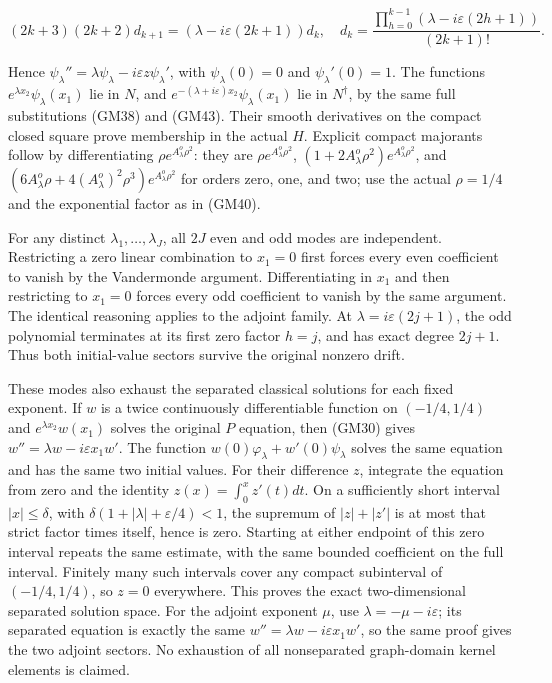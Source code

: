 \documentclass[
  11pt,
]{article}
\begin{document}
\[
 (2k+3)(2k+2)d_{k+1}
       =(\lambda-i\varepsilon(2k+1))d_k,
 \quad d_k=\frac{\prod_{h=0}^{k-1}(\lambda-i\varepsilon(2h+1))}{(2k+1)!}.
 \tag{GM48}
\]

Hence \(\psi_\lambda''=\lambda\psi_\lambda-i\varepsilon z\psi_\lambda'\), with \(\psi_\lambda(0)=0\) and
\(\psi_\lambda'(0)=1\). The functions \(e^{\lambda x_2}\psi_\lambda(x_1)\) lie
in \(N\), and \(e^{-(\lambda+i\varepsilon)x_2}\psi_\lambda(x_1)\) lie in
\(N^\dagger\), by the same full substitutions (GM38) and
(GM43). Their smooth derivatives on the compact closed square prove
membership in the actual \(H\). Explicit compact
majorants follow by differentiating \(\rho e^{A^o_\lambda\rho^2}\): they are
\(\rho e^{A^o_\lambda\rho^2}\), \((1+2A^o_\lambda\rho^2)e^{A^o_\lambda\rho^2}\), and
\((6A^o_\lambda\rho+4(A^o_\lambda)^2\rho^3)e^{A^o_\lambda\rho^2}\) for orders zero, one, and two; use the actual
\(\rho=1/4\) and the exponential factor as in (GM40).

For any distinct \(\lambda_1,\ldots,\lambda_J\), all
\(2J\) even and odd modes are independent.
Restricting a zero linear combination to \(x_1=0\)
first forces every even coefficient to vanish by the Vandermonde
argument. Differentiating in \(x_1\) and then
restricting to \(x_1=0\) forces every odd coefficient
to vanish by the same argument. The identical reasoning applies to the
adjoint family. At \(\lambda=i\varepsilon(2j+1)\), the odd polynomial
terminates at its first zero factor \(h=j\), and has
exact degree \(2j+1\). Thus both initial-value sectors
survive the original nonzero drift.

These modes also exhaust the separated classical solutions for each
fixed exponent. If \(w\) is a twice continuously
differentiable function on \((-1/4,1/4)\) and
\(e^{\lambda x_2}w(x_1)\) solves the original
\(P\) equation, then (GM30) gives
\(w''=\lambda w-i\varepsilon x_1w'\). The function \(w(0)\varphi_\lambda+w'(0)\psi_\lambda\)
solves the same equation and has the same two initial values. For their
difference \(z\), integrate the equation from zero
and the identity \(z(x)=\int_0^x z'(t)dt\). On a sufficiently short
interval \(|x|\leq\delta\), with \(\delta(1+|\lambda|+\varepsilon/4)<1\),
the supremum of \(|z|+|z'|\) is at most that strict factor
times itself, hence is zero. Starting at either endpoint of this zero
interval repeats the same estimate, with the same bounded coefficient on
the full interval. Finitely many such intervals cover any compact
subinterval of \((-1/4,1/4)\), so \(z=0\)
everywhere. This proves the exact two-dimensional separated solution
space. For the adjoint exponent \(\mu\), use
\(\lambda=-\mu-i\varepsilon\); its separated equation is exactly the same
\(w''=\lambda w-i\varepsilon x_1w'\), so the same proof gives the two adjoint
sectors. No exhaustion of all nonseparated graph-domain kernel elements
is claimed.
\end{document}
